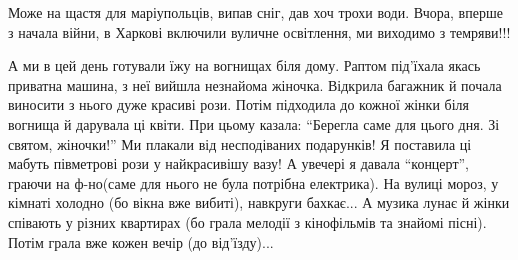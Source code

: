  
 
 
 
 

\qqSecCmt


Може на щастя для маріупольців, випав сніг, дав хоч трохи води. Вчора, вперше з
начала війни, в Харкові включили вуличне освітлення, ми виходимо з темряви!!!


А ми в цей день готували їжу на вогнищах біля дому. Раптом під'їхала якась
приватна машина, з неї вийшла незнайома жіночка. Відкрила багажник й почала
виносити з нього дуже красиві рози. Потім підходила до кожної жінки біля вогнища
й дарувала ці квіти. При цьому казала: \enquote{Берегла саме для цього дня. Зі
святом, жіночки!} Ми плакали від несподіваних подарунків! Я поставила ці мабуть
півметрові рози у найкрасивішу вазу! А увечері я давала \enquote{концерт}, граючи на
ф-но(саме для нього не була потрібна електрика). На вулиці мороз, у кімнаті
холодно (бо вікна вже вибиті), навкруги бахкає... А музика лунає й жінки співають
у різних квартирах (бо грала мелодії з кінофільмів та знайомі пісні). Потім грала
вже кожен вечір (до від'їзду)...
